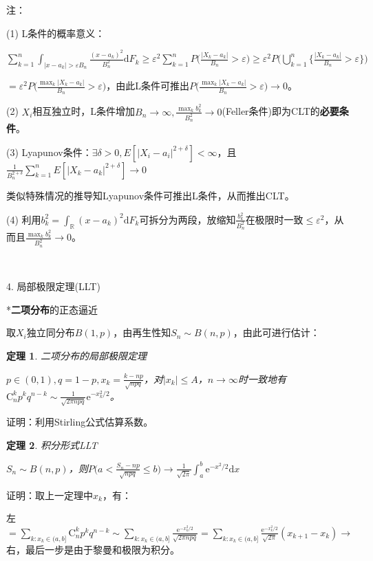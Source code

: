 \documentclass[a4paper,UTF8,fontset=windows]{ctexart}
\newtheorem{thm}{定理}[section]
\newcommand{\con}[1]{\stackrel{#1}{\longrightarrow}}
\begin{document}
注：

(1) L条件的概率意义：

$\sum_{k=1}^n\int_{|x-a_k|>\varepsilon B_n}\frac{(x-a_k)^2}{B_n^2}\mathrm{d}F_k\ge\varepsilon^2\sum_{k=1}^nP\bigg(\frac{|X_k-a_k|}{B_n}>\varepsilon\bigg)\ge\varepsilon^2P\bigg(\bigcup_{k=1}^n\bigg\{\frac{|X_k-a_k|}{B_n}>\varepsilon\bigg\}\bigg)$

$=\varepsilon^2P\bigg(\frac{\max_k|X_k-a_k|}{B_n}>\varepsilon\bigg)$，由此L条件可推出$P\bigg(\frac{\max_k|X_k-a_k|}{B_n}>\varepsilon\bigg)\con{}0$。

(2) $X_i$相互独立时，L条件增加$B_n\con{}\infty,\frac{\max_kb_k^2}{B_n^2}\con{}0$(Feller条件)即为CLT的\textbf{必要条件}。

(3) Lyapunov条件：$\exists\delta>0,E[|X_i-a_i|^{2+\delta}]<\infty$，且$\frac{1}{B_n^{2+\delta}}\sum_{k=1}^nE[|X_k-a_k|^{2+\delta}]\con{}0$

类似特殊情况的推导知Lyapunov条件可推出L条件，从而推出CLT。

(4) 利用$b_k^2=\int_\mathbb{R}(x-a_k)^2\mathrm{d}F_k$可拆分为两段，放缩知$\frac{b_k^2}{B_n^2}$在极限时一致$\le\varepsilon^2$，从而且$\frac{\max_kb_k^2}{B_n^2}\con{}0$。

~

4. 局部极限定理(LLT)

*\textbf{二项分布}的正态逼近

取$X_i$独立同分布$B(1,p)$，由再生性知$S_n\sim B(n,p)$，由此可进行估计：

\begin{thm} 二项分布的\emph{局部极限定理}

$p\in(0,1),q=1-p,x_k=\frac{k-np}{\sqrt{npq}}$，对$|x_k|\le A$，$n\to\infty$时一致地有$\mathrm{C}_n^kp^kq^{n-k}\sim\frac{1}{\sqrt{2\pi npq}}\mathrm{e}^{-x_k^2/2}$。
\end{thm}

证明：利用Stirling公式估算系数。

\begin{thm} 积分形式LLT

$S_n\sim B(n,p)$，则$P\bigg(a<\frac{S_n-np}{\sqrt{npq}}\le b\bigg)\con{}\frac{1}{\sqrt{2\pi}}\int_a^b\mathrm{e}^{-x^2/2}\mathrm{d}x$
\end{thm}

证明：取上一定理中$x_k$，有：

左$=\sum_{k:x_k\in(a,b]}\mathrm{C}_n^kp^kq^{n-k}\sim\sum_{k:x_k\in(a,b]}\frac{\mathrm{e}^{-x_k^2/2}}{\sqrt{2\pi npq}}=\sum_{k:x_k\in(a,b]}\frac{\mathrm{e}^{-x_k^2/2}}{\sqrt{2\pi}}(x_{k+1}-x_k)\con{}$右，最后一步是由于黎曼和极限为积分。
\end{document}
